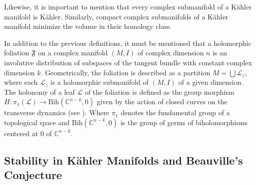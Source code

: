 \documentclass[12pt,twoside,a4paper]{report}
\newcommand{\co}{\ensuremath{\mathbb C }}
\begin{document}
Likewise, it is important to mention that every complex submanifold of a K\"ahler manifold is K\"ahler. Similarly, compact complex submanifolds of a K\"ahler manifold minimize the volume in their homology class.

In addition to the previous definitions, it must be mentioned that a holomorphic foliation $\mathfrak{F}$ on a complex manifold $(M,I)$ of complex dimension
$n$ is an involutive distribution of subspaces of the tangent bundle with constant complex dimension $k$. Geometrically, the foliation is described as a
partition $M=\bigcup\mathcal{L}_z$, where each $\mathcal{L}_z$ is a holomorphic submanifold of $(M,I)$ of a given dimension. The
holonomy of a leaf $\mathcal{L}$ of the foliation is defined as the group morphism $H:\pi_{1}(\mathcal{L})\rightarrow\textrm{Bih}(\co^{n-k},0)$ given by the
action of closed curves on the transverse dynamics (see \cite{Thurston}). Where $\pi_{1}$ denotes the fundamental group of a topological space and
    $\textrm{Bih}(\co^{n-k},0)$ is the group of germs of biholomorphisms centered at $0$ of $\co^{n-k}$.

\subsection{Stability in K\"ahler Manifolds and Beauville's Conjecture}
\end{document}
